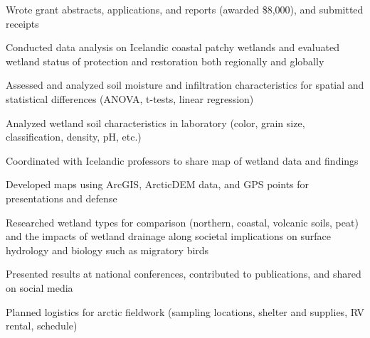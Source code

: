 \documentclass{../styles/cv}
\begin{document}
    \item Wrote grant abstracts, applications, and reports (awarded \$8,000), and submitted receipts
    \item Conducted data analysis on Icelandic coastal patchy wetlands and evaluated wetland status of protection and restoration both regionally and globally
    \item Assessed and analyzed soil moisture and infiltration characteristics for spatial and statistical differences (ANOVA, t-tests, linear regression)
    \item Analyzed wetland soil characteristics in laboratory (color, grain size, classification, density, pH, etc.)
    \item Coordinated with Icelandic professors to share map of wetland data and findings
    \item Developed maps using ArcGIS, ArcticDEM data, and GPS points for presentations and defense
    \item Researched wetland types for comparison (northern, coastal, volcanic soils, peat) and the impacts of wetland drainage along societal implications on surface hydrology and biology such as migratory birds
    \item Presented results at national conferences, contributed to publications, and shared on social media
    \item Planned logistics for arctic fieldwork (sampling locations, shelter and supplies, RV rental, schedule)
\resumesublistend
\end{document}
